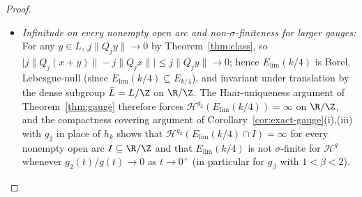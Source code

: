 \begin{proof}
\begin{itemize}[leftmargin=1.8em]
$x(\omega)=\lim_{j\to\infty}M_j/Q_j$ satisfies $|Q_jx(\omega)-M_j|<k/j<1/8$ and
has true recurrence digits $d_j(x(\omega))=d_j\in\{-k,+k\}$ for all $j\ge N$, so
$|d_j(x(\omega))|=k$ and $j\|Q_jx(\omega)\|\to k/4$. Hence the compact binary
Cantor image $K_{\mathrm{bin}}:=x(\{-k,+k\}^{\{j\ge N\}})$ lies entirely inside
$E_{\mathrm{lim}}(k/4)\cap[-4k/Q_{N+1},4k/Q_{N+1}]$ (no strict sublevel needs to
be subtracted). Equip $\{-k,+k\}^{\{j\ge N\}}$ with the uniform Bernoulli
product measure assigning weight $1/2$ to $-k$ and $1/2$ to $+k$, and let
$\mu_{\mathrm{bin}}$ be its pushforward to $K_{\mathrm{bin}}$. As in the proof
of Theorem~\ref{thm:gauge}, any interval $U$ of length
$1/Q_{n+1}\le h<1/Q_n$ ($n>N$) determines a unique $M_j$ for each $N\le j<n$ and
at most $3$ values of $M_n$, so $K_{\mathrm{bin}}\cap U$ meets at most $3$ binary
cylinders of depth $n-N$, each of $\mu_{\mathrm{bin}}$-mass $2^{-(n-N)}$. Thus
\[
\mu_{\mathrm{bin}}(U)\le 3\cdot 2^{-(n-N)}=3\cdot 2^{N+1}\cdot 2^{-(n+1)}
\le 3\cdot 2^{N+1}g_2(h),
\]
and the mass distribution principle gives
$\mathcal H^{g_2}(E_{\mathrm{lim}}(k/4))\ge\mathcal H^{g_2}(K_{\mathrm{bin}})\ge(3\cdot 2^{N+1})^{-1}>0$.
\item \emph{Infinitude on every nonempty open arc and non-$\sigma$-finiteness for larger gauges:}
For any $y\in L$, $j\|Q_jy\|\to0$ by Theorem~\ref{thm:class}, so
$\bigl|j\|Q_j(x+y)\|-j\|Q_jx\|\bigr|\le j\|Q_jy\|\to0$; hence
$E_{\mathrm{lim}}(k/4)$ is Borel, Lebesgue-null (since
$E_{\mathrm{lim}}(k/4)\subseteq E_{k/4}$), and invariant under translation by
the dense subgroup $\bar L=L/\Z$ on $\R/\Z$. The Haar-uniqueness argument of
Theorem~\ref{thm:gauge} therefore forces
$\mathcal H^{g_2}(E_{\mathrm{lim}}(k/4))=\infty$ on $\R/\Z$, and the compactness
covering argument of Corollary~\ref{cor:exact-gauge}(i),(iii) with $g_2$ in
place of $h_k$ shows that $\mathcal H^{g_2}(E_{\mathrm{lim}}(k/4)\cap I)=\infty$
for every nonempty open arc $I\subseteq\R/\Z$ and that $E_{\mathrm{lim}}(k/4)$
is not $\sigma$-finite for $\mathcal H^g$ whenever $g_2(t)/g(t)\to0$ as
$t\to0^+$ (in particular for $g_\beta$ with $1<\beta<2$).
\end{itemize}


\end{proof}
